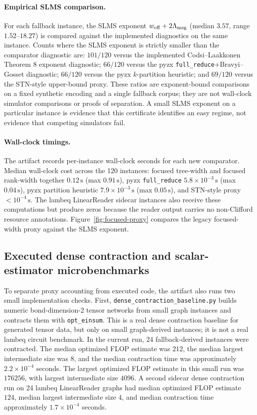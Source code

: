 \paragraph{Empirical SLMS comparison.}
For each fallback instance, the SLMS exponent \(w_{\mathrm{eff}}+2\Lambda_{\mathrm{msg}}\) (median \(3.57\), range \(1.52\)--\(18.27\)) is compared against the implemented diagnostics on the same instance. Counts where the SLMS exponent is strictly smaller than the comparator diagnostic are: \(101/120\) versus the implemented Codsi--Laakkonen Theorem 8 exponent diagnostic; \(66/120\) versus the pyzx \texttt{full\_reduce}+Bravyi--Gosset diagnostic; \(66/120\) versus the pyzx \(k\)-partition heuristic; and \(69/120\) versus the STN-style upper-bound proxy. These ratios are exponent-bound comparisons on a fixed synthetic encoding and a single fallback corpus; they are not wall-clock simulator comparisons or proofs of separation. A small SLMS exponent on a particular instance is evidence that this certificate identifies an easy regime, not evidence that competing simulators fail.

\paragraph{Wall-clock timings.}
The artifact records per-instance wall-clock seconds for each new comparator. Median wall-clock cost across the 120 instances: focused tree-width and focused rank-width together \(0.12\,\mathrm{s}\) (max \(0.91\,\mathrm{s}\)), pyzx \texttt{full\_reduce} \(5.8\times 10^{-3}\,\mathrm{s}\) (max \(0.04\,\mathrm{s}\)), pyzx partition heuristic \(7.9\times10^{-3}\,\mathrm{s}\) (max \(0.05\,\mathrm{s}\)), and STN-style proxy \(<10^{-4}\,\mathrm{s}\). The lambeq LinearReader sidecar instances also receive these computations but produce zeros because the reader output carries no non-Clifford resource annotations. Figure~\ref{fig:focused-proxy} compares the legacy focused-width proxy against the SLMS exponent.

\subsection{Executed dense contraction and scalar-estimator microbenchmarks}

To separate proxy accounting from executed code, the artifact also runs two small implementation checks. First, \texttt{dense\_contraction\_baseline.py} builds numeric bond-dimension-2 tensor networks from small graph instances and contracts them with \texttt{opt\_einsum}. This is a real dense contraction baseline for generated tensor data, but only on small graph-derived instances; it is not a real lambeq circuit benchmark. In the current run, 24 fallback-derived instances were contracted. The median optimized FLOP estimate was \(212\), the median largest intermediate size was \(8\), and the median contraction time was approximately \(2.2\times 10^{-4}\) seconds. The largest optimized FLOP estimate in this small run was \(176256\), with largest intermediate size \(4096\). A second sidecar dense contraction run on 24 lambeq LinearReader graphs had median optimized FLOP estimate \(124\), median largest intermediate size \(4\), and median contraction time approximately \(1.7\times 10^{-4}\) seconds.

